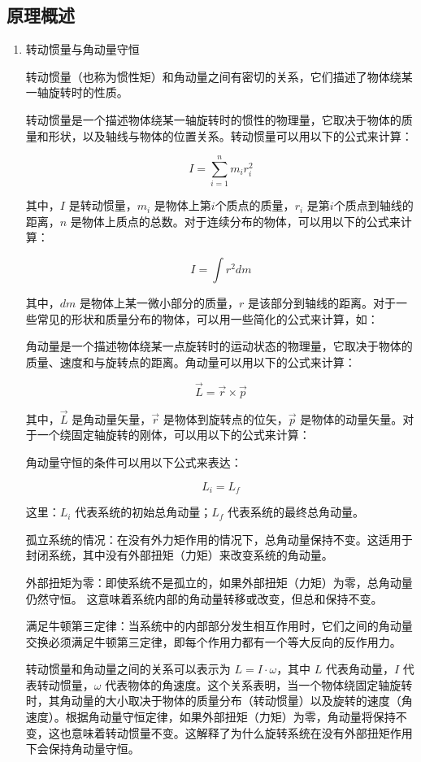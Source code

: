 \documentclass[dvipsnames, svgnames,a4paper,11pt]{article}
\begin{document}
	
	
	\subsection{原理概述}
	\begin{enumerate}
		\item 转动惯量与角动量守恒
		
		转动惯量（也称为惯性矩）和角动量之间有密切的关系，它们描述了物体绕某一轴旋转时的性质。
		
		转动惯量是一个描述物体绕某一轴旋转时的惯性的物理量，它取决于物体的质量和形状，以及轴线与物体的位置关系。转动惯量可以用以下的公式来计算：
		
		\[
		I = \sum_{i=1}^n m_i r_i^2
		\]
		
		其中，\(I\) 是转动惯量，\(m_i\) 是物体上第\(i\)个质点的质量，\(r_i\) 是第\(i\)个质点到轴线的距离，\(n\) 是物体上质点的总数。对于连续分布的物体，可以用以下的公式来计算：
		
		\[
		I = \int r^2 dm
		\]
		
		其中，\(dm\) 是物体上某一微小部分的质量，\(r\) 是该部分到轴线的距离。对于一些常见的形状和质量分布的物体，可以用一些简化的公式来计算，如：
		
		
		角动量是一个描述物体绕某一点旋转时的运动状态的物理量，它取决于物体的质量、速度和与旋转点的距离。角动量可以用以下的公式来计算：
		
		\[
		\vec{L} = \vec{r} \times \vec{p}
		\]
		
		其中，\(\vec{L}\) 是角动量矢量，\(\vec{r}\) 是物体到旋转点的位矢，\(\vec{p}\) 是物体的动量矢量。对于一个绕固定轴旋转的刚体，可以用以下的公式来计算：
		
		
		角动量守恒的条件可以用以下公式来表达：
		
		\[
		L_i = L_f
		\]
		
		这里：\(L_i\) 代表系统的初始总角动量；\(L_f\) 代表系统的最终总角动量。
		
		孤立系统的情况：在没有外力矩作用的情况下，总角动量保持不变。这适用于封闭系统，其中没有外部扭矩（力矩）来改变系统的角动量。
		
		外部扭矩为零：即使系统不是孤立的，如果外部扭矩（力矩）为零，总角动量仍然守恒。
		这意味着系统内部的角动量转移或改变，但总和保持不变。
		
		满足牛顿第三定律：当系统中的内部部分发生相互作用时，它们之间的角动量交换必须满足牛顿第三定律，即每个作用力都有一个等大反向的反作用力。
		
		转动惯量和角动量之间的关系可以表示为 \(L = I \cdot \omega\)，其中 \(L\) 代表角动量，\(I\) 代表转动惯量，\(\omega\) 代表物体的角速度。这个关系表明，当一个物体绕固定轴旋转时，其角动量的大小取决于物体的质量分布（转动惯量）以及旋转的速度（角速度）。根据角动量守恒定律，如果外部扭矩（力矩）为零，角动量将保持不变，这也意味着转动惯量不变。这解释了为什么旋转系统在没有外部扭矩作用下会保持角动量守恒。
		

\end{enumerate}
\end{document}
